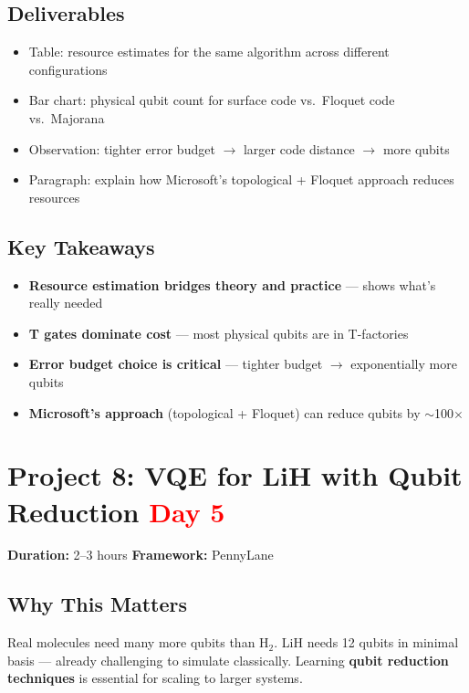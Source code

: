 \documentclass[11pt,a4paper]{article}
\begin{document}
\subsection*{Deliverables}
\begin{itemize}
    \item[\checkmark] Table: resource estimates for the same algorithm across different configurations
    \item[\checkmark] Bar chart: physical qubit count for surface code vs.\ Floquet code vs.\ Majorana
    \item[\checkmark] Observation: tighter error budget $\to$ larger code distance $\to$ more qubits
    \item[\checkmark] Paragraph: explain how Microsoft's topological + Floquet approach reduces resources
\end{itemize}

\subsection*{Key Takeaways}
\begin{itemize}
    \item \textbf{Resource estimation bridges theory and practice} --- shows what's really needed
    \item \textbf{T gates dominate cost} --- most physical qubits are in T-factories
    \item \textbf{Error budget choice is critical} --- tighter budget $\to$ exponentially more qubits
    \item \textbf{Microsoft's approach} (topological + Floquet) can reduce qubits by $\sim$100$\times$
\end{itemize}


\section{Project 8: VQE for LiH with Qubit Reduction \hfill \textcolor{red}{\textbf{Day 5}}}

\begin{questionbox}
\textbf{Duration:} 2--3 hours \quad \textbf{Framework:} PennyLane
\end{questionbox}

\subsection*{Why This Matters}
Real molecules need many more qubits than H$_2$. LiH needs 12 qubits in minimal basis --- already challenging to simulate classically. Learning \textbf{qubit reduction techniques} is essential for scaling to larger systems.
\end{document}
